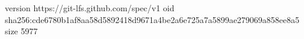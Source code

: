 version https://git-lfs.github.com/spec/v1
oid sha256:cde6780b1af8aa58d5892418d9671a4be2a6e725a7a5899ae279069a858ee8a5
size 5977
